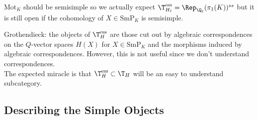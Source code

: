 \documentclass{article}
\newcommand{\SmP}{\mathrm{SmP}}
\newcommand{\Mot}{\mathrm{Mot}}
\newcommand{\ess}{\mathrm{ess}}
\begin{document}
\begin{rmk}
$\Mot_K$ should be semisimple so we actually expect $\T_{H_\ell}^{\ess} = \Rep_{\Q_\ell}(\pi_1(K))^{ss}$ but it is still open if the cohomology of $X \in \SmP_K$ is semisimple. 
\end{rmk}

Grothendieck: the objects of $\T_H^{\ess}$ are those cut out by algebraic correspondences on the $Q$-vector spaces $H(X)$ for $X \in \SmP_K$ and the morphisms induced by algebraic correspondences. However, this is not useful since we don't understand correspondences.
\bigskip\\
The expected miracle is that $\T_H^{\ess} \subset \T_H$ will be an easy to understand subcategory. 

\subsection{Describing the Simple Objects}
\end{document}
